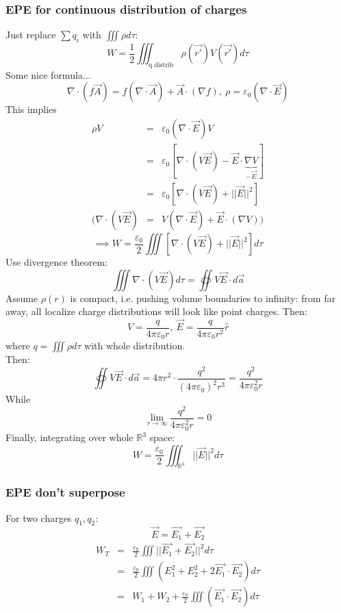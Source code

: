 \documentclass[12pt,a4paper,twoside]{article}
\numberwithin{equation}{section}
\begin{document}
\subsubsection{EPE for continuous distribution of charges}
    Just replace $\sum q_i$ with $\iiint \rho d\tau$:
    \begin{equation}
        W=\frac{1}{2}\iiint_{\textrm{q distrib}} \rho(\overrightarrow{r'})V(\overrightarrow{r'})d\tau
    \end{equation}
    Some nice formula...
    \[\nabla \cdot(f\overrightarrow{A})=f(\nabla\cdot \overrightarrow{A})+\overrightarrow{A}\cdot (\nabla f),\ \rho =\varepsilon_0(\nabla \cdot \overrightarrow{E})\]
    This implies
    \begin{eqnarray*}
        \rho V &=& \varepsilon_0 (\nabla \cdot \overrightarrow{E})V\\
        &=& \varepsilon_0[\nabla \cdot(V\overrightarrow{E})-\overrightarrow{E}\cdot\underbrace{\nabla V}_{-\overrightarrow{E}}]\\
        &=& \varepsilon_0[\nabla\cdot (V\overrightarrow{E})+||\overrightarrow{E}||^2]\\
        (\nabla\cdot(V\overrightarrow{E})&=& V(\nabla \cdot \overrightarrow{E})+\overrightarrow{E}\cdot(\nabla V))
    \end{eqnarray*}
    \[\implies W= \frac{\varepsilon_0}{2}\iiint[\nabla\cdot (V\overrightarrow{E})+||\overrightarrow{E}||^2]d\tau\]
    Use divergence theorem:
    \[\iiint \nabla \cdot (V\overrightarrow{E})d\tau=\oiint V\overrightarrow{E}\cdot d\overrightarrow{a}\]
    Assume $\rho(r)$ is compact, i.e. pushing volume boundaries to infinity: from far away, all localize charge distributions will look like point charges. Then:
    \[V=\frac{q}{4\pi\varepsilon_0 r},\ \overrightarrow{E}=\frac{q}{4\pi\varepsilon_0 r^2}\hat{r}\]
    where $q=\iiint \rho d\tau$ with whole distribution.\\
    \noindent Then:
    \[\oiint V\overrightarrow{E}\cdot d\overrightarrow{a}=4\pi r^2\cdot \frac{q^2}{(4\pi \varepsilon_0)^2r^3}=\frac{q^2}{4\pi\varepsilon_0^2 r}\]
    While
    \[\lim_{r\to\infty}\frac{q^2}{4\pi\varepsilon_0^2 r}=0\]
    Finally, integrating over whole $\mathbb{R}^3$ space:
    \[W=\frac{\varepsilon_0}{2}\iiint_{\mathbb{R}^3}||\overrightarrow{E}||^2d\tau\]
\subsubsection{EPE don't superpose}
    For two charges $q_1, q_2$:
        \[\overrightarrow{E} = \overrightarrow{E_1}+\overrightarrow{E_2}\]
        \begin{eqnarray*}
        W_T &=& \frac{\varepsilon_0}{2}\iiint ||\overrightarrow{E_1}+\overrightarrow{E_2}||^2d\tau\\
        &=& \frac{\varepsilon_0}{2}\iiint(E_1^2+E_2^2+2\overrightarrow{E_1}\cdot \overrightarrow{E_2})d\tau\\
        &=& W_1+W_2+\frac{\varepsilon_0}{2}\iiint (\overrightarrow{E_1}\cdot\overrightarrow{E_2})d\tau
        \end{eqnarray*}
\end{document}

